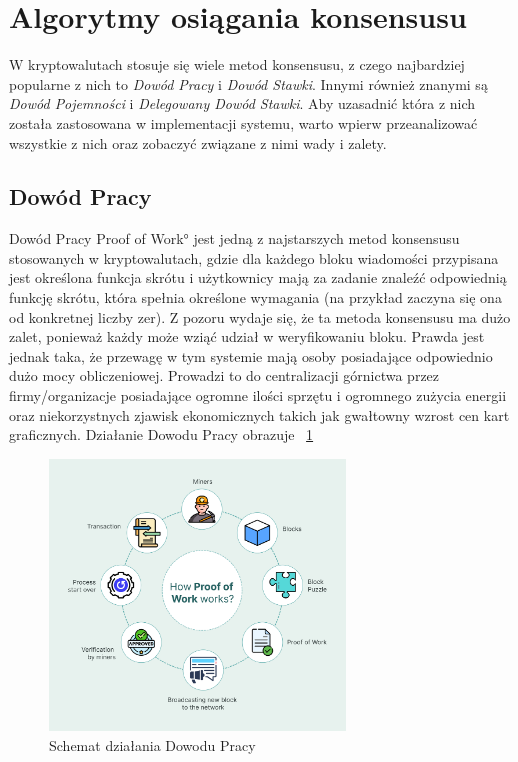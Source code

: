 \section{Algorytmy osiągania konsensusu}
\label{sec:Konsensus}
W kryptowalutach stosuje się wiele metod konsensusu, z czego najbardziej popularne z nich to \textit{Dowód Pracy} i \textit{Dowód Stawki}. Innymi również znanymi są \textit{Dowód Pojemności} i \textit{Delegowany Dowód Stawki}. Aby uzasadnić która z nich została zastosowana w implementacji systemu, warto wpierw przeanalizować wszystkie z nich oraz zobaczyć związane z nimi wady i zalety.
\subsection{Dowód Pracy}
\label{ssec:PoW}
Dowód Pracy \ang{Proof of Work} jest jedną z najstarszych metod konsensusu stosowanych w kryptowalutach, gdzie dla każdego bloku wiadomości przypisana jest określona funkcja skrótu i użytkownicy mają za zadanie znaleźć odpowiednią funkcję skrótu, która spełnia określone wymagania (na przykład zaczyna się ona od konkretnej liczby zer). Z pozoru wydaje się, że ta metoda konsensusu ma dużo zalet, ponieważ każdy może wziąć udział w weryfikowaniu bloku. Prawda jest jednak taka, że przewagę w tym systemie mają osoby posiadające odpowiednio dużo mocy obliczeniowej. Prowadzi to do centralizacji górnictwa przez firmy/organizacje posiadające ogromne ilości sprzętu i ogromnego zużycia energii oraz niekorzystnych zjawisk ekonomicznych takich jak gwałtowny wzrost cen kart graficznych.
Działanie Dowodu Pracy obrazuje \figurename{~\ref{fig:ConsesnsusProofOfWork}}
\begin{figure}[H]
    \centering
    \includegraphics[width=0.7\textwidth]{Images/ConsesnsusProofOfWork.png}
    \caption{Schemat działania Dowodu Pracy}
    \label{fig:ConsesnsusProofOfWork}
\end{figure}
